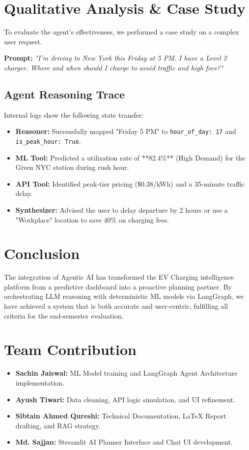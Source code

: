 \documentclass{article}
\begin{document}
\section{Qualitative Analysis \& Case Study}
To evaluate the agent's effectiveness, we performed a case study on a complex user request.

\textbf{Prompt:} \textit{"I'm driving to New York this Friday at 5 PM. I have a Level 2 charger. Where and when should I charge to avoid traffic and high fees?"}

\subsection{Agent Reasoning Trace}
Internal logs show the following state transfer:
\begin{itemize}
    \item \textbf{Reasoner:} Successfully mapped "Friday 5 PM" to \texttt{hour\_of\_day: 17} and \texttt{is\_peak\_hour: True}.
    \item \textbf{ML Tool:} Predicted a utilization rate of **82.4\%** (High Demand) for the Given NYC station during rush hour.
    \item \textbf{API Tool:} Identified peak-tier pricing (\$0.38/kWh) and a 35-minute traffic delay.
    \item \textbf{Synthesizer:} Advised the user to delay departure by 2 hours or use a "Workplace" location to save 40\% on charging fees.
\end{itemize}

\section{Conclusion}
The integration of Agentic AI has transformed the EV Charging intelligence platform from a predictive dashboard into a proactive planning partner. By orchestrating LLM reasoning with deterministic ML models via LangGraph, we have achieved a system that is both accurate and user-centric, fulfilling all criteria for the end-semester evaluation.

\section{Team Contribution}
\begin{itemize}
    \item \textbf{Sachin Jaiswal:} ML Model training and LangGraph Agent Architecture implementation.
    \item \textbf{Ayush Tiwari:} Data cleaning, API logic simulation, and UI refinement.
    \item \textbf{Sibtain Ahmed Qureshi:} Technical Documentation, LaTeX Report drafting, and RAG strategy.
    \item \textbf{Md. Sajjan:} Streamlit AI Planner Interface and Chat UI development.
\end{itemize}
\end{document}
